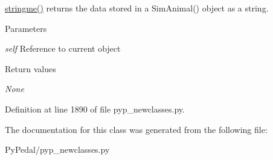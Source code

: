\hyperlink{classPyPedal_1_1pyp__newclasses_1_1SimAnimal_a7be8292fd4f0713e344461670ca6c47b}{stringme()} returns the data stored in a SimAnimal() object as a string. 


\begin{DoxyParams}{Parameters}
\item[{\em self}]Reference to current object \end{DoxyParams}

\begin{DoxyRetVals}{Return values}
\item[{\em None}]\end{DoxyRetVals}


Definition at line 1890 of file pyp\_\-newclasses.py.



The documentation for this class was generated from the following file:\begin{DoxyCompactItemize}
\item 
PyPedal/pyp\_\-newclasses.py\end{DoxyCompactItemize}
